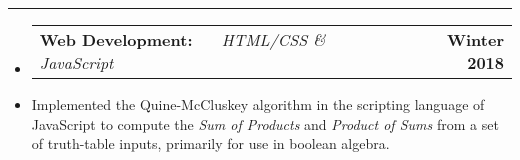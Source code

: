 \documentclass[10pt,letterpaper]{article}
\makeatletter
\newcommand{\header}[2]
{
	\begin{tabular*}{\linewidth}{l @{\extracolsep{\fill}} r}
		\hspace{-27pt} #1 & #2 \\
	\end{tabular*}
}
\makeatother
\begin{document}
\hrule

\begin{itemize}
	\item[]
		\header
			{	
				\textbf{Web Development: }
				\href{https://aashpointo.github.io/KmapWebsite/}{\emph{\underline{\smash{KmapWebsite}}}} \ \ \ \footnotesize \emph{HTML/CSS \& JavaScript}
				}
				{\textbf{Winter 2018}}
		\item
			Implemented the Quine-McCluskey algorithm in the scripting language of JavaScript to compute the \emph{Sum of Products} and \emph{Product of Sums} from a set of truth-table inputs, primarily for use in boolean algebra.

\end{itemize}
\end{document}
